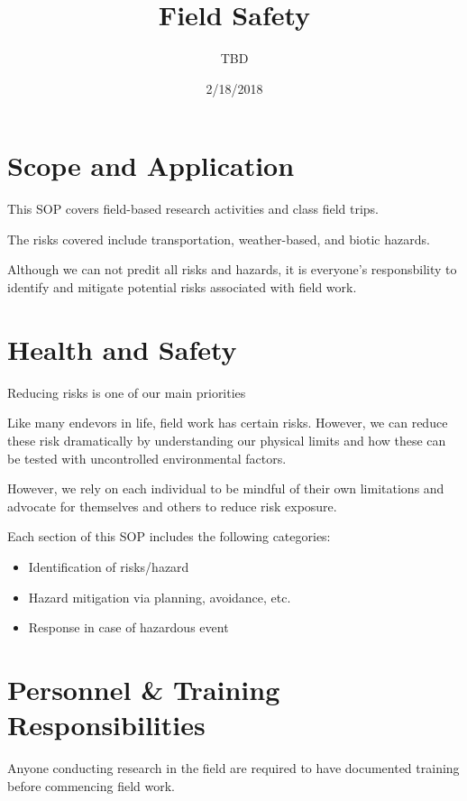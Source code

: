 \documentclass[12pt]{../SOP3_beta}\usepackage[]{graphicx}\usepackage[]{color}
\title{Field Safety}
\date{2/18/2018}
\author{TBD}
\begin{document}
\maketitle

\section{Scope and Application}

\NP This SOP covers field-based research activities and class field trips. 

\NP The risks covered include transportation, weather-based, and biotic hazards.

\NP Although we can not predit all risks and hazards, it is everyone's responsbility to identify and mitigate potential risks associated with field work.

\tableofcontents
\newpage

\section{Health and Safety}

\NP Reducing risks is one of our main priorities

\NP Like many endevors in life, field work has certain risks. However, we can reduce these risk dramatically by understanding our physical limits and how these can be tested with uncontrolled environmental factors.

\NP However, we rely on each individual to be mindful of their own limitations and advocate for themselves and others to reduce risk exposure.

\NP Each section of this SOP includes the following categories:

\begin{itemize}
  \item Identification of risks/hazard
  \item Hazard mitigation via planning, avoidance, etc.
  \item Response in case of hazardous event
\end{itemize}

\section{Personnel \& Training Responsibilities}

\NP Anyone conducting research in the field are required to have documented training before commencing field work. 
\end{document}
